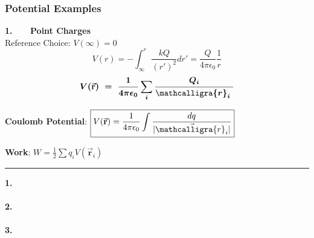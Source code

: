 \documentclass[12pt]{article}
\newcommand{\scripty}[1]{\ensuremath{\mathcalligra{#1}}}
\newcommand*{\cursr}{\scripty{r}}		%
\begin{document}
\newpage
\subsubsection{Potential Examples}
\vspace{10pt}
\begin{minipage}[t]{0.5\textwidth}
	\textbf{1. \ \ \ Point Charges}\\[10pt]
	Reference Choice: \( V(\infty) = 0\)
	\[ V( r ) = - \int_{ \infty }^{r} \frac{k Q}{(r')^2} dr'
		= \frac{Q}{4 \pi \epsilon_0} \frac{1}{r} \]
	\[ \boldsymbol{ V(\vec{ \mathbf{r} }) \ 
		= \ \frac{1}{4 \pi \epsilon_0} \sum_i \frac{Q_i}{\cursr_i \ } } \]
	
	\vspace{20pt}
	\textbf{Coulomb Potential}: \indent 
	\( \displaystyle \boxed{ V(\vec{ \mathbf{r} }) 
		= \frac{1}{4 \pi \epsilon_0} \int \frac{dq}{| \vec{\cursr_i} |} }\)

	\vspace{20pt}
	\textbf{Work}: \indent 
	\( \displaystyle \boxed{ W = \frac{1}{2} \sum q_i V(\vec{ \mathbf{r} }_i) } \)
\end{minipage}
\rule[-438pt]{.5pt}{450pt}
\hspace{0.02\textwidth}
\begin{minipage}[t]{0.5\textwidth}
	\textbf{1. \ \ \ }\\ \\

	
	\hfill \break
	\textbf{2. \ \ \ }\\ \\

	\hfill \break
	\textbf{3. \ \ \ }\\ \\
	
\end{minipage}
\end{document}
